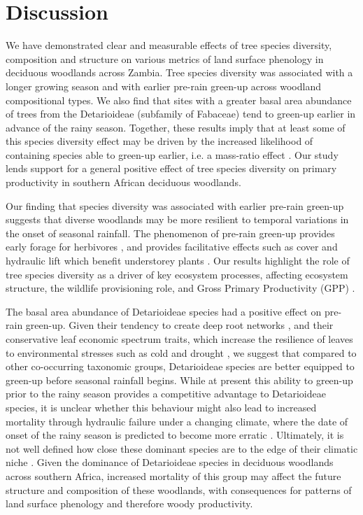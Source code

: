 \documentclass[11pt,a4paper]{article}
\begin{document}
\section{Discussion}

We have demonstrated clear and measurable effects of tree species diversity,
composition and structure on various metrics of land surface phenology in
deciduous woodlands across Zambia. Tree species diversity was associated with a
longer growing season and with earlier pre-rain green-up across woodland
compositional types. We also find that sites with a greater basal area
abundance of trees from the Detarioideae (subfamily of Fabaceae) tend to
green-up earlier in advance of the rainy season. Together, these results imply
that at least some of this species diversity effect may be driven by the
increased likelihood of containing species able to green-up earlier, i.e. a
mass-ratio effect \citep{Grime1996}. Our study lends support for a general
positive effect of tree species diversity on primary productivity in southern
African deciduous woodlands. 

Our finding that species diversity was associated with earlier pre-rain
green-up suggests that diverse woodlands may be more resilient to temporal
variations in the onset of seasonal rainfall. The phenomenon of pre-rain
green-up provides early forage for herbivores \citep{Morellato2016}, and
provides facilitative effects such as cover and hydraulic lift which benefit
understorey plants \citep{Domec2010, Yu2015}. Our results highlight the role of
tree species diversity as a driver of key ecosystem processes, affecting
ecosystem structure, the wildlife provisioning role, and Gross Primary
Productivity (GPP) \citep{Richardson2009}. 

The basal area abundance of Detarioideae species had a positive effect on
pre-rain green-up. Given their tendency to create deep root networks
\citep{Zhou2020}, and their conservative leaf economic spectrum traits, which
increase the resilience of leaves to environmental stresses such as cold and
drought \citep{Wigley2016}, we suggest that compared to other co-occurring
taxonomic groups, Detarioideae species are better equipped to green-up before
seasonal rainfall begins. While at present this ability to green-up prior to
the rainy season provides a competitive advantage to Detarioideae species, it
is unclear whether this behaviour might also lead to increased mortality
through hydraulic failure under a changing climate, where the date of onset of
the rainy season is predicted to become more erratic \citep{Vinya2018}.
Ultimately, it is not well defined how close these dominant species are to the
edge of their climatic niche \citep{Jinga2019}. Given the dominance of
Detarioideae species in deciduous woodlands across southern Africa, increased
mortality of this group may affect the future structure and composition of
these woodlands, with consequences for patterns of land surface phenology and
therefore woody productivity.
\end{document}
